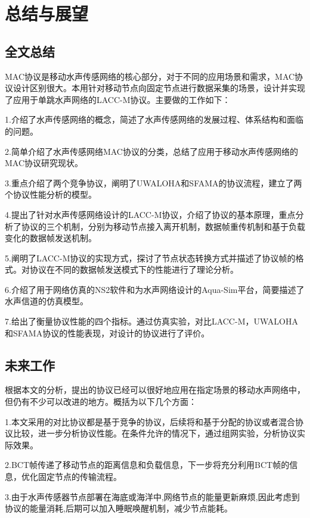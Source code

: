 \chapter{总结与展望}
\section {全文总结}
MAC协议是移动水声传感网络的核心部分，对于不同的应用场景和需求，MAC协议设计区别很大。本用针对移动节点向固定节点进行数据采集的场景，设计并实现了应用于单跳水声网络的LACC-M协议。主要做的工作如下：

1.介绍了水声传感网络的概念，简述了水声传感网络的发展过程、体系结构和面临的问题。

2.简单介绍了水声传感网络MAC协议的分类，总结了应用于移动水声传感网络的MAC协议研究现状。

3.重点介绍了两个竞争协议，阐明了UWALOHA和SFAMA的协议流程，建立了两个协议性能分析的模型。

4.提出了针对水声传感网络设计的LACC-M协议，介绍了协议的基本原理，重点分析了协议的三个机制，分别为移动节点接入离开机制，数据帧重传机制和基于负载变化的数据帧发送机制。

5.阐明了LACC-M协议的实现方式，探讨了节点状态转换方式并描述了协议帧的格式。对协议在不同的数据帧发送模式下的性能进行了理论分析。

6.介绍了用于网络仿真的NS2软件和为水声网络设计的Aqua-Sim平台，简要描述了水声信道的仿真模型。

7.给出了衡量协议性能的四个指标。通过仿真实验，对比LACC-M，UWALOHA和SFAMA协议的性能表现，对设计的协议进行了评价。

\section {未来工作}
根据本文的分析，提出的协议已经可以很好地应用在指定场景的移动水声网络中，但仍有不少可以改进的地方。概括为以下几个方面：

1.本文采用的对比协议都是基于竞争的协议，后续将和基于分配的协议或者混合协议比较，进一步分析协议性能。在条件允许的情况下，通过组网实验，分析协议实际效果。

2.BCT帧传递了移动节点的距离信息和负载信息，下一步将充分利用BCT帧的信息，优化固定节点的传输流程。

3.由于水声传感器节点部署在海底或海洋中,网络节点的能量更新麻烦,因此考虑到协议的能量消耗,后期可以加入睡眠唤醒机制，减少节点能耗。

\endinput